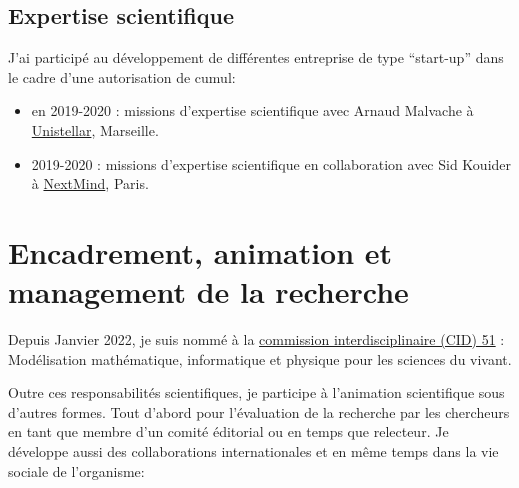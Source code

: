 \documentclass[10pt,french,a4paper,oneside]{article}%
\begin{document}
\subsection{Expertise scientifique} %

J'ai participé au développement de différentes entreprise de type ``start-up'' dans le cadre d'une autorisation de cumul:

\begin{itemize}
	\item en 2019-2020 : missions d'expertise scientifique avec Arnaud Malvache à \href{https://unistellaroptics.com/}{Unistellar}, Marseille.

	\item 2019-2020 : missions d'expertise scientifique en collaboration avec Sid Kouider à \href{https://www.next-mind.com/}{NextMind}, Paris.
\end{itemize}

\section{Encadrement, animation et management de la recherche}


Depuis Janvier 2022, je suis nommé à la \href{https://www.cnrs.fr/comitenational/cid/cid.php?cid=51}{commission interdisciplinaire (CID) 51} : Modélisation mathématique, informatique et physique pour les sciences du vivant.

Outre ces responsabilités scientifiques, je participe à l'animation scientifique sous d'autres formes. Tout d'abord pour l'évaluation de la recherche par les chercheurs en tant que membre d'un comité éditorial ou en temps que relecteur. Je développe aussi des collaborations internationales et en même temps dans la vie sociale de l'organisme:
\end{document}
